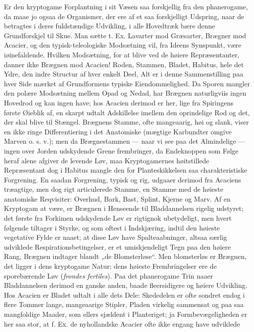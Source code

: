 \documentclass[12pt,a4paper]{book}
\begin{document}
Er den kryptogame Forplantning i sit Væsen saa forskjellig fra den
phanerogame, da maae jo ogsaa de Organismer, der ere af et saa
forskjelligt Udspring, naar de betragtes i deres fuldstændige Udvikling,
i alle Hovedtræk bære denne Grundforskjel til Skue. Man sætte t. Ex.
Lavarter mod Græsarter, Brægner mod Acacier, og den typisk-teleologiske
Modsætning vil, fra Ideens Synspunkt, være iøinefaldende. Hvilken
Modsætning, for at blive ved de høiere Repræsentanter, danner ikke
Brægnen mod Acacien! Roden, Stammen, Bladet, Habitus, hele det Ydre, den
indre Structur af hver enkelt Deel, Alt er i denne Sammenstilling paa
hver Side mærket af Grundformens typiske Eiendommelighed. Da Sporen
mangler den polære Modsætning mellem Opad og Nedad, har Brægnen
naturligviis ingen Hovedrod og kan ingen have; hos Acacien derimod er
her, lige fra Spiringens første Øieblik af, en skarpt udtalt Adskillelse
imellem den oprindelige Rod og det, der skal blive til Stængel.
Brægnens Stamme, ofte mangeaarig, høi og slank, viser en ikke ringe
Differentiering i det Anatomiske (mægtige Karbundter omgive Marven
o. s. v.); men da Brægnestammen --- naar vi see paa det Almindelige ---
ingen over Jorden udskydende Grene frembringer, da Endeknoppen som Følge
heraf alene afgiver de levende Løv, maa Kryptogamernes høitstillede
Repræsentant dog i Habitus mangle den for Planteskikkelsen saa
charakteristiske Forgrening. En saadan Forgrening, typisk og rig,
udgaaer derimod fra Acaciens træagtige, men dog rigt articulerede
Stamme, en Stamme med de høieste anatomiske Reqvisiter: Overhud, Bark,
Bast, Splint, Kjerne og Marv. Af en Kryptogam at være, er Brægnen i
Henseende til Bladdannelsen rigelig udstyret; det første fra Forkimen
udskydende Løv er rigtignok ubetydeligt, men hvert følgende tiltager i
Styrke, og som oftest i Indskjæring, indtil den høieste vegetative Fylde
er naaet; at disse Løv have Spalteaabninger, altsaa særlig udviklede
Respirationsbetingelser, er et umiskjendeligt Tegn paa den høiere Rang,
Brægnen indtager blandt „de Blomsterløse“. Men blomsterløs er Brægnen,
det ligger i dens kryptogame Natur: dens høieste Frembringelser ere de
sporebærende Løv (\textit{frondes fertiles}). Paa det phanerogame Trin
naaer Bladdannelsen derimod en ganske anden, baade fleersidigere og
høiere Udvikling. Hos Acacien er Bladet udtalt i alle dets Dele:
Skededelen er ofte sondret endog i flere Tommer lange, mangeaarige
Stipler, Pladen virkelig sammensat og paa saa mangfoldige Maader, som
ellers sjældent i Planteriget; ja Formbevægeligheden er her saa stor, at
f. Ex. de nyhollandske Acacier ofte ikke engang have udviklede
\end{document}
